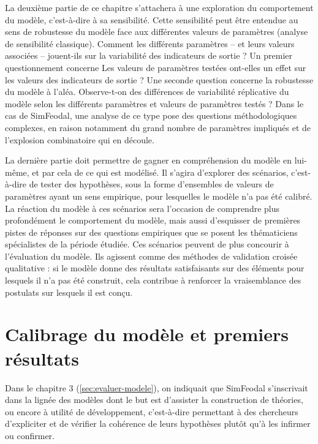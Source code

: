 La deuxième partie de ce chapitre s'attachera à une exploration du comportement du modèle, c'est-à-dire à sa sensibilité.
Cette sensibilité peut être entendue au sens de robustesse du modèle face aux différentes valeurs de paramètres (analyse de sensibilité classique).
Comment les différents paramètres -- et leurs valeurs associées -- jouent-ils sur la variabilité des indicateurs de sortie ?
Un premier questionnement concerne
Les valeurs de paramètres testées ont-elles un effet sur les valeurs des indicateurs de sortie ?
Une seconde question concerne la robustesse du modèle à l'aléa.
Observe-t-on des différences de variabilité réplicative du modèle selon les différents paramètres et valeurs de paramètres testés ?
Dans le cas de SimFeodal, une analyse de ce type pose des questions méthodologiques complexes, en raison notamment du grand nombre de paramètres impliqués et de \og l'explosion combinatoire\fg{} qui en découle.

La dernière partie doit permettre de gagner en compréhension du modèle en lui-même, et par cela de ce qui est modélisé.
Il s'agira d'explorer des \og scénarios\fg{}, c'est-à-dire de tester des hypothèses, sous la forme d'ensembles de valeurs de paramètres ayant un sens empirique, pour lesquelles le modèle n'a pas été calibré.
La réaction du modèle à ces scénarios sera l'occasion de comprendre plus profondément le comportement du modèle, mais aussi d'esquisser de premières pistes de réponses sur des questions empiriques que se posent les thématiciens spécialistes de la période étudiée.
Ces scénarios peuvent de plus concourir à l'évaluation du modèle.
Ils agissent comme des méthodes de \og validation croisée\fg{} qualitative : si le modèle donne des résultats satisfaisants sur des éléments pour lesquels il n'a pas été construit, cela contribue à renforcer la vraisemblance des postulats sur lesquels il est conçu.

\section{Calibrage du modèle et premiers résultats}

Dans le chapitre 3 (\cref{sec:evaluer-modele}), on indiquait que SimFeodal s'inscrivait dans la lignée des  modèles dont le but est d'\og assister la construction de théories\fg{}, ou encore \og à utilité de développement\fg{}, c'est-à-dire permettant à des chercheurs d'expliciter et de vérifier la cohérence de leurs hypothèses plutôt qu'à les infirmer ou confirmer.

